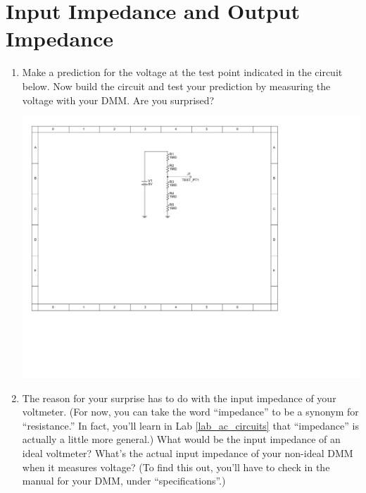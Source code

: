 \section{Input Impedance and Output Impedance}
\label{lab_input_output_impedance}


\bigskip

\begin{enumerate}[wide]

\item Make a prediction for the voltage at the test point indicated in the circuit below.  Now build the circuit and test your prediction by measuring the voltage with your DMM.  Are you surprised?   \label{part_voltage_surprise}

\begin{center}
\includegraphics{input_output_impedance/input_impedance1.pdf}
\end{center}

\item The reason for your surprise has to do with the input impedance of your voltmeter.  (For now, you can take the word ``impedance'' to be a synonym for ``resistance.''  In fact, you'll learn in Lab \ref{lab_ac_circuits} that ``impedance'' is actually a little more general.)  What would be the input impedance of an ideal voltmeter?  What's the actual input impedance of your non-ideal DMM when it measures voltage?  (To find this out, you'll have to check in the manual for your DMM, under ``specifications''.) \label{part_dmm_impedance}


\end{enumerate}

